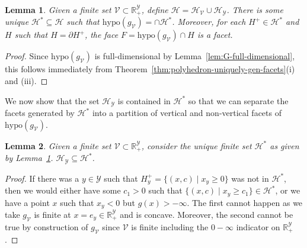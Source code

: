 \documentclass[11pt]{article}
\newcommand{\Comments}{1}
\newcommand{\mynote}[2]{\ifnum\Comments=1\textcolor{#1}{#2}\fi}
\newcommand{\raf}[1]{\mynote{darkgreen}{[RF: #1]}}
\newcommand{\reals}{\mathbb{R}}
\renewcommand{\H}{\mathcal{H}}
\newcommand{\V}{\mathcal{V}}
\newcommand{\Y}{\mathcal{Y}}
\newcommand{\inprod}[2]{\langle #1, #2 \rangle}%
\newcommand{\hyp}{\mathrm{hypo}}
\newtheorem{lemma}{Lemma}
\begin{document}
\begin{lemma}\label{lem:G-unique-facets-Hstar}
  Given a finite set $\V \subset \reals^\Y_+$, define $\H = \H_\V \cup \H_\Y$.
  There is some unique $\H^* \subseteq \H$ such that $\hyp(g_\V) = \cap \H^*$. 
  Moreover, for each $H^+ \in\H^*$ and $H$ such that $H = \partial H^+$, the face $F = \hyp(g_\V) \cap H$ is a facet. 
\end{lemma}
\begin{proof}
  Since $\hyp(g_\V)$ is full-dimensional by Lemma~\ref{lem:G-full-dimensional}, this follows immediately from Theorem~\ref{thm:polyhedron-uniquely-gen-facets}(i) and (iii).
\end{proof}

We now show that the set $\H_\Y$ is contained in $\H^*$ so that we can separate the facets generated by $\H^*$ into a partition of vertical and non-vertical facets of $\hyp(g_\V)$.

\begin{lemma}\label{lem:HY-subset-Hstar}
  Given a finite set $\V \subset \reals^\Y_+$, consider the unique finite set $\H^*$ as given by Lemma~\ref{lem:G-unique-facets-Hstar}. %
  $\H_\Y \subseteq \H^*$. 
\end{lemma}
\begin{proof}
  If there was a $y \in \Y$ such that $H^+_y = \{(x,c) \mid x_y \geq 0\}$ was not in $\H^*$, then we would either have some $c_1 > 0$ such that $\{(x,c) \mid x_y \geq c_1\} \in \H^*$, or we have a point $x$ such that $x_y < 0$ but $g(x) > -\infty$.
  The first cannot happen as we take $g_\V$ is finite at $x = e_y \in \reals^\Y_+$ and is concave.
  Moreover, the second cannot be true by construction of $g_\V$ since $\V$ is finite including the $0-\infty$ indicator on $\reals^\Y_+$.	
\end{proof}
\end{document}
